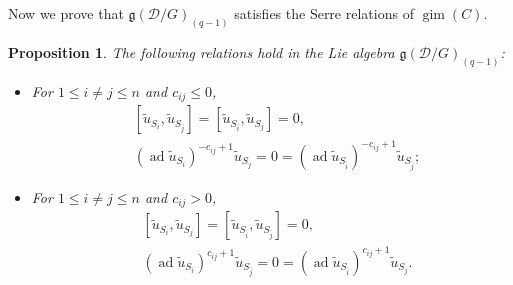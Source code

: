 \documentclass[12pt,reqno]{amsart}
\numberwithin{equation}{section}
\newtheorem{proposition}[theorem]{Proposition}
\begin{document}
	Now we prove that $\mathfrak{g}(\mathcal{D}/G)_{(q-1)}$ satisfies the Serre relations of $\operatorname{gim}(C)$.
	\begin{proposition}\label{pro:Serre-relation}
		The following relations hold in the Lie algebra $\mathfrak{g}(\mathcal{D}/G)_{(q-1)}$:
		\begin{itemize}
			\item[(1)] For $1\leq i\neq j\leq n$ and $c_{ij}\leq 0$, 
			\begin{align}
				&[\tilde{u}_{{S_i}}, \tilde{u}_{{S_{\bar{j}}}}]=[\tilde{u}_{{S_{\bar i}}}, \tilde{u}_{{S_j}}]=0,\\
				&(\operatorname{ad} \tilde{u}_{{S_i}})^{-c_{ij}+1} \tilde{u}_{{S_j}}=0= (\operatorname{ad} \tilde{u}_{{S_{\bar i}}})^{-c_{ij}+1} \tilde{u}_{{S_{\bar j}}};\label{rel:serre-rel-<0}
			\end{align}
			
			\item[(2)] For $1\leq i\neq j\leq n$ and $c_{ij}> 0$,
			\begin{align}
				&[\tilde{u}_{{S_i}},\tilde{u}_{{S_j}}]=[\tilde{u}_{{S_{\bar i}}}, \tilde{u}_{{S_{\bar j}}}]=0,\label{rel:serre-rel->00}\\
				&(\operatorname{ad} \tilde{u}_{{S_i}})^{c_{ij}+1} \tilde{u}_{{S_{\bar j}}}=0= (\operatorname{ad} \tilde{u}_{{S_{\bar i}}})^{c_{ij}+1} \tilde{u}_{{S_j}}.\label{rel:serre-rel->01}
			\end{align}
			
		\end{itemize}
		
	\end{proposition}
\end{document}
